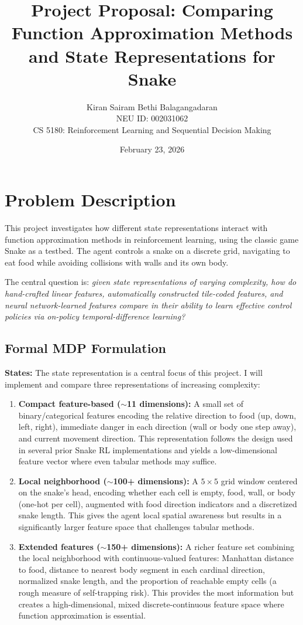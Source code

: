 \documentclass[11pt]{article}
\title{Project Proposal: Comparing Function Approximation Methods\\and State Representations for Snake}
\author{
    Kiran Sairam Bethi Balagangadaran\\
    NEU ID: 002031062\\
    CS 5180: Reinforcement Learning and Sequential Decision Making
}
\date{February 23, 2026}
\begin{document}
\maketitle

\section{Problem Description}

This project investigates how different state representations interact with function approximation methods in reinforcement learning, using the classic game Snake as a testbed. The agent controls a snake on a discrete grid, navigating to eat food while avoiding collisions with walls and its own body.

The central question is: \emph{given state representations of varying complexity, how do hand-crafted linear features, automatically constructed tile-coded features, and neural network-learned features compare in their ability to learn effective control policies via on-policy temporal-difference learning?}

\subsection{Formal MDP Formulation}

\textbf{States:} The state representation is a central focus of this project. I will implement and compare three representations of increasing complexity:

\begin{enumerate}
    \item \textbf{Compact feature-based ($\sim$11 dimensions):} A small set of binary/categorical features encoding the relative direction to food (up, down, left, right), immediate danger in each direction (wall or body one step away), and current movement direction. This representation follows the design used in several prior Snake RL implementations \citep{loeber2020snakeai, zhou2023snake} and yields a low-dimensional feature vector where even tabular methods may suffice.

    \item \textbf{Local neighborhood ($\sim$100+ dimensions):} A $5 \times 5$ grid window centered on the snake's head, encoding whether each cell is empty, food, wall, or body (one-hot per cell), augmented with food direction indicators and a discretized snake length. This gives the agent local spatial awareness but results in a significantly larger feature space that challenges tabular methods.

    \item \textbf{Extended features ($\sim$150+ dimensions):} A richer feature set combining the local neighborhood with continuous-valued features: Manhattan distance to food, distance to nearest body segment in each cardinal direction, normalized snake length, and the proportion of reachable empty cells (a rough measure of self-trapping risk). This provides the most information but creates a high-dimensional, mixed discrete-continuous feature space where function approximation is essential.
\end{enumerate}
\end{document}
